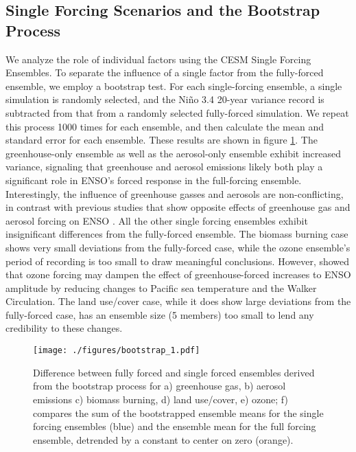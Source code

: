 \documentclass[12pt]{article}
\begin{document}
\subsection{Single Forcing Scenarios and the Bootstrap Process}
We analyze the role of individual factors using the CESM Single Forcing Ensembles. To separate the influence of a single factor from the fully-forced ensemble, we employ a bootstrap test. For each single-forcing ensemble, a single simulation is randomly selected, and the Niño 3.4 20-year variance record is subtracted from that from a randomly selected fully-forced simulation. We repeat this process 1000 times for each ensemble, and then calculate the mean and standard error for each ensemble. These results are shown in figure \ref{fig:bootstrap_1}. The greenhouse-only ensemble as well as the aerosol-only ensemble exhibit increased variance, signaling that greenhouse and aerosol emissions likely both play a significant role in ENSO's forced response in the full-forcing ensemble. Interestingly, the influence of greenhouse gasses and aerosols are non-conflicting, in contrast with previous studies that show opposite effects of greenhouse gas and aerosol forcing on ENSO \parencite{stevenson2019forced}. All the other single forcing ensembles exhibit insignificant differences from the fully-forced ensemble. The biomass burning case shows very small deviations from the fully-forced case, while the ozone ensemble's period of recording is too small to draw meaningful conclusions. However, \cite{nowack2017role} showed that ozone forcing may dampen the effect of greenhouse-forced increases to ENSO amplitude by reducing changes to Pacific sea temperature and the Walker Circulation. The land use/cover case, while it does show large deviations from the fully-forced case, has an ensemble size (5 members) too small to lend any credibility to these changes.

\begin{figure}[htbp]
\centering
\texttt{[image: ./figures/bootstrap\_1.pdf]}
\caption{\label{fig:bootstrap_1}Difference between fully forced and single forced ensembles derived from the bootstrap process for a) greenhouse gas, b) aerosol emissions c) biomass burning, d) land use/cover, e) ozone; f) compares the sum of the bootstrapped ensemble means for the single forcing ensembles (blue) and the ensemble mean for the full forcing ensemble, detrended by a constant to center on zero (orange).}
\end{figure}
\end{document}
